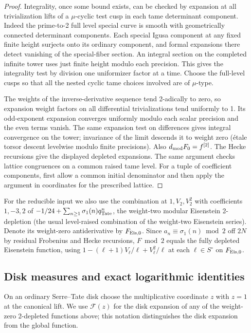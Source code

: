 \begin{proof}
Integrality, once some bound exists, can be checked by expansion at all trivialization lifts of a \(\mu\)-cyclic test cusp in each tame determinant component. Indeed the prime-to-2 full level special curve is smooth with geometrically connected determinant components. Each special Igusa component at any fixed finite height surjects onto its ordinary component, and formal expansions there detect vanishing of the special-fiber section. An integral section on the completed infinite tower uses just finite height modulo each precision. This gives the integrality test by division one uniformizer factor at a time. Choose the full-level cusps so that all the nested cyclic tame choices involved are of \(\mu\)-type. 

The weights of the inverse-derivative sequence tend 2-adically to zero, so expansion weight factors on all differential trivializations tend uniformly to 1. Its odd-exponent expansion converges uniformly modulo each scalar precision and the even terms vanish. The same expansion test on differences gives integral convergence on the tower; invariance of the limit descends it to weight zero (étale torsor descent levelwise modulo finite precisions). Also \(d_{\rm mod}F_0=f^{[2]}\). The Hecke recursions give the displayed depleted expansions.  The same
argument checks lattice congruences on a common raised tame level.  For a
tuple of coefficient components, first allow a common initial denominator
and then apply the argument in coordinates for the prescribed lattice.
\end{proof}

For the reducible input we also use the combination at \(1,V_2,V_2^2\) with coefficients \(1,-3,2\) of \(-1/24+\sum_{n\ge1}\sigma_1(n)q_{\rm Tate}^n\), the weight-two modular Eisenstein 2-depletion (the usual level-raised combination of the weight-two Eisenstein series). Denote its weight-zero antiderivative by \(F_{{\rm Eis},0}\). Since \(a_n\equiv\sigma_1(n)\bmod2\) off \(2N\) by residual Frobenius and Hecke recursions, \(F\bmod 2\) equals the fully depleted Eisenstein function, using \(1-(\ell+1)V_\ell/\ell+V_\ell^2/\ell\) at each \(\ell\in S^\circ\) on \(F_{{\rm Eis},0}\).

\subsection{Disk measures and exact logarithmic identities}

On an ordinary Serre--Tate disk choose the multiplicative coordinate \(z\)
with \(z=1\) at the canonical lift.  We use \(\mathcal F(z)\) for the disk
expansion of any of the weight-zero 2-depleted functions above; this
notation distinguishes the disk expansion from the global function.


